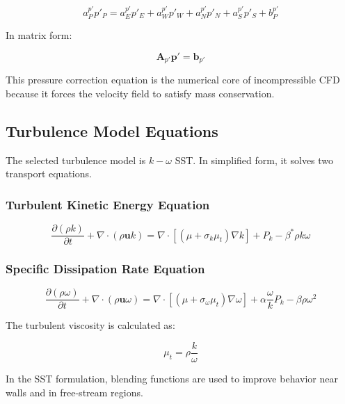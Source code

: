 \documentclass[12pt,a4paper]{article}
\begin{document}
\begin{equation}
    a_P^{p'} p'_P = a_E^{p'} p'_E + a_W^{p'} p'_W + a_N^{p'} p'_N + a_S^{p'} p'_S + b_P^{p'}
\end{equation}

In matrix form:

\begin{equation}
    \bm{A}_{p'}\bm{p}' = \bm{b}_{p'}
\end{equation}

This pressure correction equation is the numerical core of incompressible CFD because it forces the velocity field to satisfy mass conservation.

\subsection{Turbulence Model Equations}

The selected turbulence model is \(k-\omega\) SST. In simplified form, it solves two transport equations.

\subsubsection{Turbulent Kinetic Energy Equation}

\begin{equation}
    \frac{\partial (\rho k)}{\partial t} + \nabla \cdot (\rho \bm{u} k) = \nabla\cdot \left[ \left( \mu + \sigma_k \mu_t  \right) \nabla k \right] +P_k  - \beta^* \rho k \omega
\end{equation}

\subsubsection{Specific Dissipation Rate Equation}

\begin{equation}
    \frac{\partial (\rho \omega)}{\partial t}+ \nabla \cdot (\rho \bm{u} \omega) = \nabla \cdot \left[ \left(\mu + \sigma_{\omega} \mu_t\right)\nabla \omega\right]+\alpha \frac{\omega}{k}P_k -\beta \rho \omega^2
\end{equation}

The turbulent viscosity is calculated as:

\begin{equation}
    \mu_t = \rho \frac{k}{\omega}
\end{equation}

In the SST formulation, blending functions are used to improve behavior near walls and in free-stream regions.
\end{document}
